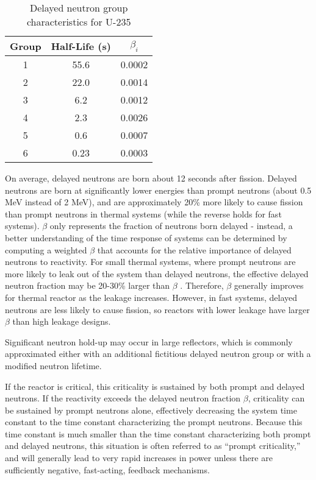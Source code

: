 \begin{table}[h]
\caption{Delayed neutron group characteristics for U-235 \cite{duderstadt}}
\centering
\begin{tabular}{c |c c}
\hline\hline
 Group & Half-Life (s) & \(\beta_i\) \\ [0.5ex]
\hline 
1 & 55.6 & 0.0002 \\
2 & 22.0 & 0.0014 \\
3 & 6.2  & 0.0012 \\
4 & 2.3  & 0.0026 \\
5 & 0.6  & 0.0007 \\
6 & 0.23 & 0.0003 \\
\hline
\end{tabular}
\label{tab:U235_kinetics}
\end{table}

On average, delayed neutrons are born about 12 seconds after fission. Delayed neutrons are born at significantly lower energies than prompt neutrons (about 0.5 MeV instead of 2 MeV), and are approximately 20\% more likely to cause fission than prompt neutrons in thermal systems (while the reverse holds for fast systems). \(\beta\) only represents the fraction of neutrons born delayed - instead, a better understanding of the time response of systems can be determined by computing a weighted \(\beta\) that accounts for the relative importance of delayed neutrons to reactivity. For small thermal systems, where prompt neutrons are more likely to leak out of the system than delayed neutrons, the effective delayed neutron fraction may be 20-30\% larger than \(\beta\) \cite{duderstadt}. Therefore, \(\beta\) generally improves for thermal reactor as the leakage increases. However, in fast systems, delayed neutrons are less likely to cause fission, so reactors with lower leakage have larger \(\beta\) than high leakage designs. 

Significant neutron hold-up may occur in large reflectors, which is commonly approximated either with an additional fictitious delayed neutron group \cite{xin_wang_thesis} or with a modified neutron lifetime.

If the reactor is critical, this criticality is sustained by both prompt and delayed neutrons. If the reactivity exceeds the delayed neutron fraction \(\beta\), criticality can be sustained by prompt neutrons alone, effectively decreasing the system time constant to the time constant characterizing the prompt neutrons. Because this time constant is much smaller than the time constant characterizing both prompt and delayed neutrons, this situation is often referred to as ``prompt criticality,'' and will generally lead to very rapid increases in power unless there are sufficiently negative, fast-acting, feedback mechanisms. 

